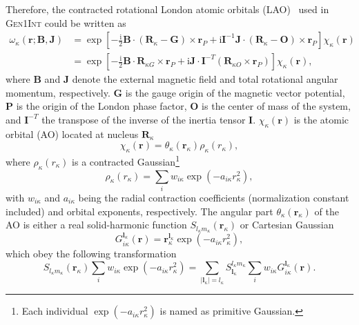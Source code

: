 \documentclass[a4paper,11pt,twoside,openright]{book}
\begin{document}
Therefore, the contracted rotational London atomic orbitals (LAO)~\cite{Gauss:JCP105:2804,bgkr}
used in \textsc{Gen1Int} could be written as
\begin{align}
  \label{eq:LAO}
  \omega_{\kappa}(\boldsymbol{r};\boldsymbol{B},\boldsymbol{J})
  &=\exp\left[-\tfrac{\text{i}}{2}\boldsymbol{B}\cdot(\boldsymbol{R}_{\kappa}-\boldsymbol{G})\times\boldsymbol{r}_{P}%
    +\text{i}\mathbf{I}^{-1}\boldsymbol{J}\cdot(\boldsymbol{R}_{\kappa}-\boldsymbol{O})%
      \times\boldsymbol{r}_{P}\right]\chi_{\kappa}(\boldsymbol{r})\\
  &=\exp\left[-\tfrac{\text{i}}{2}\boldsymbol{B}\cdot\boldsymbol{R}_{\kappa G}\times\boldsymbol{r}_{P}%
    +\text{i}\boldsymbol{J}\cdot\mathbf{I}^{-T}(\boldsymbol{R}_{\kappa O}\times\boldsymbol{r}_{P})\right]%
      \chi_{\kappa}(\boldsymbol{r}),\nonumber
\end{align}
where $\boldsymbol{B}$ and $\boldsymbol{J}$ denote the external magnetic field and total rotational
angular momentum, respectively. $\boldsymbol{G}$ is the gauge origin of the magnetic vector potential,
$\boldsymbol{P}$ is the origin of the London phase factor, $\boldsymbol{O}$ is the center of mass of the system,
and $\mathbf{I}^{-T}$ the transpose of the inverse of the inertia tensor $\mathbf{I}$. $\chi_{\kappa}(\boldsymbol{r})$
is the atomic orbital (AO) located at nucleus $\boldsymbol{R}_{\kappa}$
\begin{equation}
  \label{eq:AO}
  \chi_{\kappa}(\boldsymbol{r})=\theta_{\kappa}(\boldsymbol{r}_{\kappa})\rho_{\kappa}(r_{\kappa}),
\end{equation}
where $\rho_{\kappa}(r_{\kappa})$ is a contracted Gaussian\footnote{Each individual $\exp(-a_{i\kappa}r_{\kappa}^{2})$
is named as primitive Gaussian.}
\begin{equation}
  \label{eq:radctr}
  \rho_{\kappa}(r_{\kappa})=\sum_{i}w_{i\kappa}\exp(-a_{i\kappa}r_{\kappa}^{2}),
\end{equation}
with $w_{i\kappa}$ and $a_{i\kappa}$ being the radial contraction coefficients (normalization constant included)
and orbital exponents, respectively. The angular part $\theta_{\kappa}(\boldsymbol{r}_{\kappa})$ of the AO
is either a real solid-harmonic function $S_{l_{\kappa}m_{\kappa}}(\boldsymbol{r}_{\kappa})$ or Cartesian Gaussian
\begin{equation}
  \label{eq:CGTO}
  G_{i\kappa}^{\boldsymbol{l}_{\kappa}}(\boldsymbol{r})
    =\boldsymbol{r}_{\kappa}^{\boldsymbol{l}_{\kappa}}\exp(-a_{i\kappa}r_{\kappa}^2),
\end{equation}
which obey the following transformation~\cite{Helgaker:2000}
\begin{equation}
  \label{eq:CGTO-to-SGTO}
  S_{l_{\kappa}m_{\kappa}}(\boldsymbol{r}_{\kappa})\sum_{i}w_{i\kappa}\exp\left(-a_{i\kappa}r_{\kappa}^{2}\right)
  =\sum_{|\boldsymbol{l}_{\kappa}|=l_{\kappa}}S^{l_{\kappa}m_{\kappa}}_{\boldsymbol{l}_{\kappa}}%
    \sum_{i}w_{i\kappa}G_{i\kappa}^{\boldsymbol{l}_{\kappa}}(\boldsymbol{r}).
\end{equation}
\end{document}
